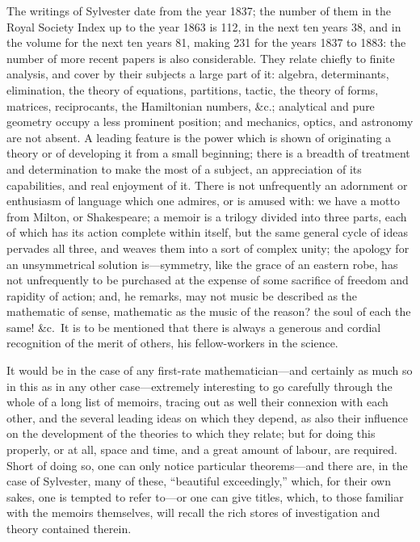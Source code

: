 \documentclass[11pt,a4paper]{book}
\begin{document}
The writings of Sylvester date from the year 1837; the number of them in the Royal Society Index up to the year 1863 is 112, in the next ten years 38, and in the volume for the next ten years 81, making 231 for the years 1837 to 1883: the number of more recent papers is also considerable. They relate chiefly to finite analysis, and cover by their subjects a large part of it: algebra, determinants, elimination, the theory of equations, partitions, tactic, the theory of forms, matrices, reciprocants, the Hamiltonian numbers, \&c.; analytical and pure geometry occupy a less prominent position; and mechanics, optics, and astronomy are not absent. A leading feature is the power which is shown of originating a theory or of developing it from a small beginning; there is a breadth of treatment and determination to make the most of a subject, an appreciation of its capabilities, and real enjoyment of it. There is not unfrequently an adornment or enthusiasm of language which one admires, or is amused with: we have a motto from Milton, or Shakespeare; a memoir is a trilogy divided into three parts, each of which has its action complete within itself, but the same general cycle of ideas pervades all three, and weaves them into a sort of complex unity; the apology for an unsymmetrical solution is---symmetry, like the grace of an eastern robe, has not unfrequently to be purchased at the expense of some sacrifice of freedom and rapidity of action; and, he remarks, may not music be described as the mathematic of sense, mathematic as the music of the reason? the soul of each the same! \&c.\ It is to be mentioned that there is always a generous and cordial recognition of the merit of others, his fellow-workers in the science.

It would be in the case of any first-rate mathematician---and certainly as much so in this as in any other case---extremely interesting to go carefully through the whole of a long list of memoirs, tracing out as well their connexion with each other, and the several leading ideas on which they depend, as also their influence on the development of the theories to which they relate; but for doing this properly, or at all, space and time, and a great amount of labour, are required. Short of doing so, one can only notice particular theorems---and there are, in the case of Sylvester, many of these, ``beautiful exceedingly,'' which, for their own sakes, one is tempted to refer to---or one can give titles, which, to those familiar with the memoirs themselves, will recall the rich stores of investigation and theory contained therein.
\end{document}
